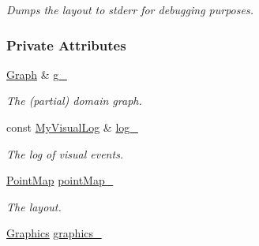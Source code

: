 \begin{DoxyCompactItemize}
\begin{DoxyCompactList}\small\item\em Dumps the layout to stderr for debugging purposes. \end{DoxyCompactList}\end{DoxyCompactItemize}
\subsubsection*{Private Attributes}
\begin{DoxyCompactItemize}
\item 
\hyperlink{structslb_1_1core_1_1ui_1_1Drawer_a70000b142df2f4e01123aa4bed5fd3a2}{Graph} \& \hyperlink{structslb_1_1core_1_1ui_1_1Drawer_a153935449f0929292b4e9407dd260d42}{g\+\_\+}\hypertarget{structslb_1_1core_1_1ui_1_1Drawer_a153935449f0929292b4e9407dd260d42}{}\label{structslb_1_1core_1_1ui_1_1Drawer_a153935449f0929292b4e9407dd260d42}

\begin{DoxyCompactList}\small\item\em The (partial) domain graph. \end{DoxyCompactList}\item 
const \hyperlink{structslb_1_1core_1_1ui_1_1Drawer_a1e0ed3482642e5d13e234f83bf690b8a}{My\+Visual\+Log} \& \hyperlink{structslb_1_1core_1_1ui_1_1Drawer_a968565e997ae415bc7c30aafdc93529e}{log\+\_\+}\hypertarget{structslb_1_1core_1_1ui_1_1Drawer_a968565e997ae415bc7c30aafdc93529e}{}\label{structslb_1_1core_1_1ui_1_1Drawer_a968565e997ae415bc7c30aafdc93529e}

\begin{DoxyCompactList}\small\item\em The log of visual events. \end{DoxyCompactList}\item 
\hyperlink{structslb_1_1core_1_1ui_1_1Drawer_a5d8ae089b9b1f95a780bb1b0ef7d05e6}{Point\+Map} \hyperlink{structslb_1_1core_1_1ui_1_1Drawer_a3744c0f39a867c7a09cc079b775e22a3}{point\+Map\+\_\+}\hypertarget{structslb_1_1core_1_1ui_1_1Drawer_a3744c0f39a867c7a09cc079b775e22a3}{}\label{structslb_1_1core_1_1ui_1_1Drawer_a3744c0f39a867c7a09cc079b775e22a3}

\begin{DoxyCompactList}\small\item\em The layout. \end{DoxyCompactList}\item 
\hyperlink{structslb_1_1core_1_1ui_1_1Graphics}{Graphics} \hyperlink{structslb_1_1core_1_1ui_1_1Drawer_ad90d552a5024e6f11a7b622a17f117b5}{graphics\+\_\+}\hypertarget{structslb_1_1core_1_1ui_1_1Drawer_ad90d552a5024e6f11a7b622a17f117b5}{}\label{structslb_1_1core_1_1ui_1_1Drawer_ad90d552a5024e6f11a7b622a17f117b5}


\end{DoxyCompactItemize}
